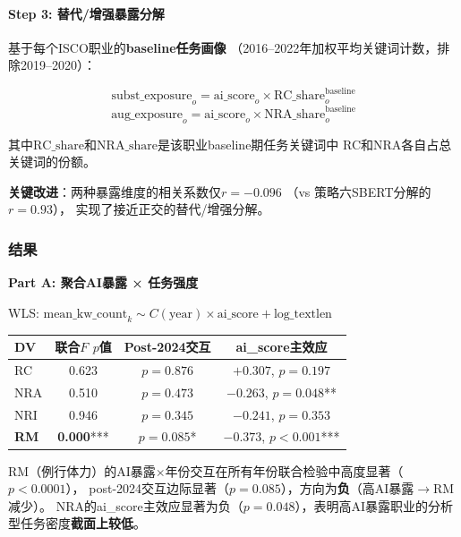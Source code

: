 \documentclass[12pt,a4paper]{ctexart}
\begin{document}
\paragraph{Step 3: 替代/增强暴露分解}

基于每个ISCO职业的\textbf{baseline任务画像}
（2016--2022年加权平均关键词计数，排除2019--2020）：

\[
\text{subst\_exposure}_o = \text{ai\_score}_o \times \text{RC\_share}_o^{\text{baseline}}
\]
\[
\text{aug\_exposure}_o = \text{ai\_score}_o \times \text{NRA\_share}_o^{\text{baseline}}
\]

其中$\text{RC\_share}$和$\text{NRA\_share}$是该职业baseline期任务关键词中
RC和NRA各自占总关键词的份额。

\textbf{关键改进}：两种暴露维度的相关系数仅$r = -0.096$
（vs 策略六SBERT分解的$r=0.93$），
实现了接近正交的替代/增强分解。

\subsubsection{结果}

\begin{resultbox}

\textbf{Part A: 聚合AI暴露 × 任务强度}

WLS: $\text{mean\_kw\_count}_k \sim C(\text{year}) \times \text{ai\_score} + \text{log\_textlen}$

\begin{center}
\small
\begin{tabular}{lccc}
\toprule
DV & 联合$F$ $p$值 & Post-2024交互 & ai\_score主效应 \\
\midrule
RC & 0.623 & $p=0.876$ & $+0.307$, $p=0.197$ \\
NRA & 0.510 & $p=0.473$ & $-0.263$, $p=0.048$** \\
NRI & 0.946 & $p=0.345$ & $-0.241$, $p=0.353$ \\
\textbf{RM} & \textbf{0.000}*** & $p=0.085$* & $-0.373$, $p<0.001$*** \\
\bottomrule
\end{tabular}
\end{center}

RM（例行体力）的AI暴露$\times$年份交互在所有年份联合检验中高度显著（$p<0.0001$），
post-2024交互边际显著（$p=0.085$），方向为\textbf{负}（高AI暴露$\to$RM减少）。
NRA的ai\_score主效应显著为负（$p=0.048$），表明高AI暴露职业的分析型任务密度\textbf{截面上较低}。
\end{resultbox}
\end{document}
